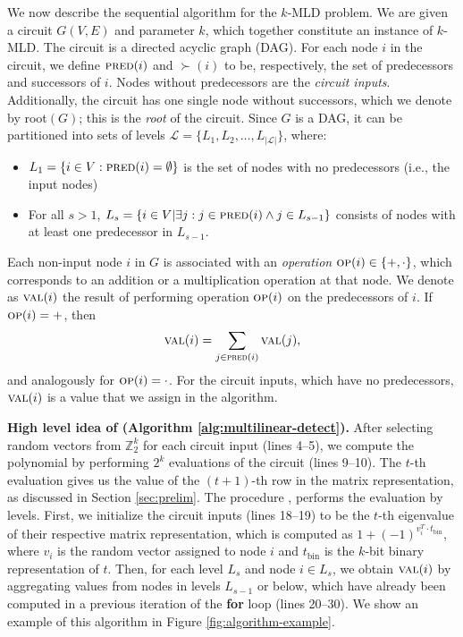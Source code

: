 We now describe the sequential algorithm \maxwt{} for the $k$-MLD problem.
We are given a circuit $G(V,E)$ and parameter $k$, which together constitute an instance of $k$-MLD. 
The circuit is a directed acyclic graph (DAG).
For each node $i$ in the circuit, we define ${\textsc{pred}}(i)$ and $\succ(i)$ to be, 
respectively, the set of predecessors and successors of $i$. Nodes without predecessors 
are the \emph{circuit inputs}. Additionally, the circuit has one single node without 
successors, which we denote by root$(G)$; this is the \emph{root} of the circuit. 
Since $G$ is a DAG, it can be partitioned into
sets of levels $\mathcal{L} = \{L_1, L_2, \ldots, L_{|\mathcal{L}|}\}$, where:
\begin{itemize}
\item
$L_1 = \{i \in V: {\textsc{pred}}(i) = \emptyset\}$
is the set of nodes with no predecessors (i.e., the input nodes)
\item
For all $s>1$,
$L_s = \{i \in V | \exists j: j\in {\textsc{pred}}(i) \wedge j \in L_{s-1}\}$
consists of nodes with at least one predecessor in $L_{s-1}$.
\end{itemize}

Each non-input node $i$ in $G$ is associated with an \emph{operation} $\textsc{op}(i) \in \{+, \cdot\}$, 
which corresponds to an addition or a multiplication operation at that node.
We denote as $\textsc{val}(i)$ the result of performing operation $\textsc{op}(i)$ on the predecessors of $i$. 
If $\textsc{op}(i) = +$, then
$$
\textsc{val}(i) = \sum_{j \in {\textsc{pred}}(i)} \textsc{val}(j),
$$
and analogously for $\textsc{op}(i) = \cdot$. For the circuit inputs, which have no predecessors, 
$\textsc{val}(i)$ is a value that we assign in the algorithm.

\noindent
\textbf{High level idea of \maxwt{} (Algorithm \ref{alg:multilinear-detect}).}
After selecting random vectors from $\mathbb{Z}_2^k$ for each circuit input (lines 4--5), 
we compute the polynomial by performing $2^k$ evaluations of the circuit (lines 9--10). 
The $t$-{th} evaluation gives us the value of the $(t + 1)$-th row in the matrix 
representation, as discussed in Section \ref{sec:prelim}. The procedure \algcircuit{}, 
performs the evaluation by levels. First, we initialize the circuit inputs (lines 18--19) 
to be the $t$-th eigenvalue of their respective matrix representation, which is computed 
as $1 + (-1)^{v_i^T\cdot t_{\text{bin}}}$, where $v_i$ is the random vector assigned to node 
$i$ and $t_{\text{bin}}$ is the $k$-bit binary representation of $t$. 
Then, for each level $L_s$ and node $i\in L_s$, we obtain $\textsc{val}(i)$ by aggregating 
values from nodes in levels $L_{s-1}$ or below, which have already been computed in 
a previous iteration of the \textbf{for} loop (lines 20--30). 
We show an example of this algorithm in Figure \ref{fig:algorithm-example}.

